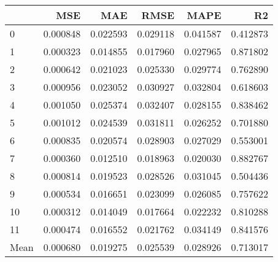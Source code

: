 \begin{tabular}{lrrrrr}
\toprule
 & MSE & MAE & RMSE & MAPE & R2 \\
\midrule
0 & 0.000848 & 0.022593 & 0.029118 & 0.041587 & 0.412873 \\
1 & 0.000323 & 0.014855 & 0.017960 & 0.027965 & 0.871802 \\
2 & 0.000642 & 0.021023 & 0.025330 & 0.029774 & 0.762890 \\
3 & 0.000956 & 0.023052 & 0.030927 & 0.032804 & 0.618603 \\
4 & 0.001050 & 0.025374 & 0.032407 & 0.028155 & 0.838462 \\
5 & 0.001012 & 0.024539 & 0.031811 & 0.026252 & 0.701880 \\
6 & 0.000835 & 0.020574 & 0.028903 & 0.027029 & 0.553001 \\
7 & 0.000360 & 0.012510 & 0.018963 & 0.020030 & 0.882767 \\
8 & 0.000814 & 0.019523 & 0.028526 & 0.031045 & 0.504436 \\
9 & 0.000534 & 0.016651 & 0.023099 & 0.026085 & 0.757622 \\
10 & 0.000312 & 0.014049 & 0.017664 & 0.022232 & 0.810288 \\
11 & 0.000474 & 0.016552 & 0.021762 & 0.034149 & 0.841576 \\
Mean & 0.000680 & 0.019275 & 0.025539 & 0.028926 & 0.713017 \\
\bottomrule
\end{tabular}
